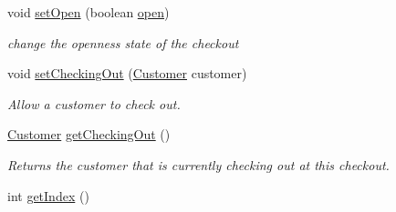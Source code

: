 \begin{CompactItemize}
\item 
void \hyperlink{class_checkout_f4ff6004dc1e5848236915d97fe9f023}{setOpen} (boolean \hyperlink{class_checkout_d85ffcc88f238ab5d7f2b5f27558178d}{open})
\begin{CompactList}\small\item\em change the openness state of the checkout \item\end{CompactList}\item 
void \hyperlink{class_checkout_4caefc9df80b65941d7ab1a32c274366}{setCheckingOut} (\hyperlink{class_customer}{Customer} customer)
\begin{CompactList}\small\item\em Allow a customer to check out. \item\end{CompactList}\item 
\hyperlink{class_customer}{Customer} \hyperlink{class_checkout_34ad05140dec86ca8726f703075a2f20}{getCheckingOut} ()
\begin{CompactList}\small\item\em Returns the customer that is currently checking out at this checkout. \item\end{CompactList}\item 
\hypertarget{class_checkout_20206bf51cc442d00d5c06ef3fa3bfb9}{
int \hyperlink{class_checkout_20206bf51cc442d00d5c06ef3fa3bfb9}{getIndex} ()}
\label{class_checkout_20206bf51cc442d00d5c06ef3fa3bfb9}


\end{CompactItemize}
